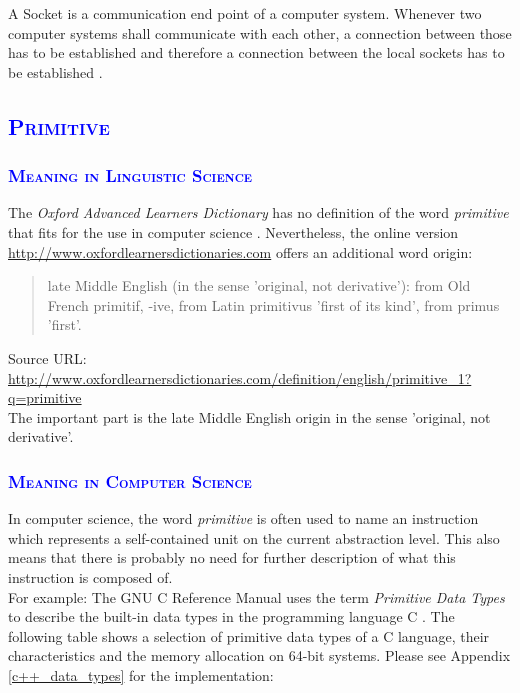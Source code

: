 \documentclass[xcolor=dvipsnames]{article}
\begin{document}
A Socket is a communication end point of a computer system. Whenever two computer systems shall communicate with each other, a connection between those has to be established and therefore a connection between the local sockets has to be established \cite[p. 553, ch. 6.5.2]{computer_networks}.

\subsection{\scshape{\textcolor{blue}{Primitive}}}

\subsubsection{\scshape{\textcolor{blue}{Meaning in Linguistic Science}}}

\noindent The \textit{Oxford Advanced Learners Dictionary} has no definition of the word \textit{primitive} that fits for the use in computer science \cite[p. 1197]{oxford_dictionary}. Nevertheless, the online version \url{http://www.oxfordlearnersdictionaries.com} offers an additional word origin:

\begin{quote}
late Middle English (in the sense 'original, not derivative'): from Old French primitif, -ive, from Latin primitivus 'first of its kind', from primus 'first'.
\end{quote}

\noindent \small{Source URL: \url{http://www.oxfordlearnersdictionaries.com/definition/english/primitive_1?q=primitive}}\\

\noindent The important part is the late Middle English origin in the sense 'original, not derivative'.

\subsubsection{\scshape{\textcolor{blue}{Meaning in Computer Science}}}

In computer science, the word \textit{primitive} is often used to name an instruction which represents a self-contained unit on the current abstraction level. This also means that there is probably no need for further description of what this instruction is composed of.\\

\noindent For example: The GNU C Reference Manual uses the term \textit{Primitive Data Types} to describe the built-in data types in the programming language C \cite[p. 8, ch. 2]{GNU_C_manual}. The following table shows a selection of primitive data types of a C language, their characteristics and the memory allocation on 64-bit systems. Please see Appendix \ref{c++_data_types} for the implementation:\\
\end{document}
